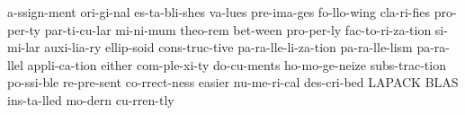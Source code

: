 \hyphenation
{
a-ssign-ment
ori-gi-nal 
es-ta-bli-shes 
va-lues 
pre-ima-ges 
fo-llo-wing
cla-ri-fies
pro-per-ty
par-ti-cu-lar
mi-ni-mum
theo-rem
bet-ween
pro-per-ly
fac-to-ri-za-tion
si-mi-lar
auxi-lia-ry
ellip-soid
cons-truc-tive
pa-ra-lle-li-za-tion
pa-ra-lle-lism
pa-ra-llel
appli-ca-tion
either
com-ple-xi-ty
do-cu-ments
ho-mo-ge-neize
subs-trac-tion
po-ssi-ble
re-pre-sent
co-rrect-ness
easier
nu-me-ri-cal
des-cri-bed
LAPACK
BLAS
ins-ta-lled
mo-dern
cu-rren-tly
}
